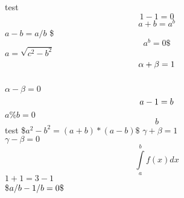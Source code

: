 \documentclass{article}
\newcommand{\test}[2]{#1+1=#2-1}
\begin{document}
test
\[1-1=0\]
$$a+b=a^b$$ $a-b=a/b$
\$$$a^b
=0\$$$
$
a=\sqrt{c^2-b^2}
$
\\$$\alpha+\beta=1
\\$$ \\$\alpha-\beta=0$ $$a-1=b\\$$
$a\%b= %
0$
$$b$$ %
%
test \$$a^2-b^2=(a+b)*(a-b)\$$
$\gamma+\beta=1$
\\$\gamma-\beta=0$
$$\int\limits_a^b f(x)dx$$ $\test{1}{3}$ \\\$$a/b-1/b=0\\\$$
\end{document}

